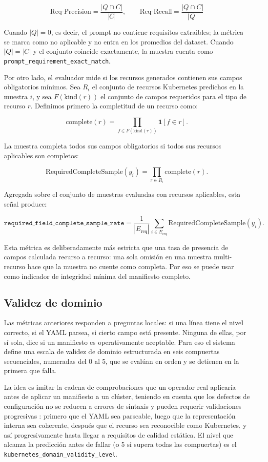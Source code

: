 $$\text{Req-Precision} = \frac{|Q \cap C|}{|C|}, \qquad \text{Req-Recall} = \frac{|Q \cap C|}{|Q|}$$

Cuando $|Q| = 0$, es decir, el prompt no contiene requisitos extraibles; la métrica se marca como no aplicable y no entra en los promedios
del dataset. Cuando $|Q| = |C|$ y el conjunto coincide exactamente, la muestra cuenta como \texttt{prompt\_requirement\_exact\_match}.

Por otro lado, el evaluador mide si los recursos generados contienen sus campos obligatorios mínimos. Sea \(R_i\) el conjunto de recursos Kubernetes predichos en la muestra \(i\),
y sea \(F(\mathrm{kind}(r))\) el conjunto de campos requeridos para el tipo de recurso \(r\). Definimos primero la completitud de un recurso como:

\[
\mathrm{complete}(r) =
\prod_{f \in F(\mathrm{kind}(r))}\mathbf{1}[f \in r].
\]

La muestra completa todos sus campos obligatorios si todos sus recursos aplicables son completos:

\[
\mathrm{RequiredCompleteSample}(y_i) =
\prod_{r \in R_i}\mathrm{complete}(r).
\]

Agregada sobre el conjunto de muestras evaluadas con recursos aplicables, esta señal produce:

\[
\texttt{required\_field\_complete\_sample\_rate}
=
\frac{1}{|E_\mathrm{req}|}
\sum_{i \in E_\mathrm{req}}
\mathrm{RequiredCompleteSample}(y_i).
\]

Esta métrica es deliberadamente más estricta que una tasa de presencia de campos calculada recurso a recurso: una sola omisión en una muestra multi-recurso hace que la muestra no
cuente como completa. Por eso se puede usar como indicador de integridad mínima del manifiesto completo.

\subsection{Validez de dominio}
\label{sec:ch4_metrics_domain}

Las métricas anteriores responden a preguntas locales: si una línea tiene el nivel correcto, si el YAML parsea, si cierto campo está presente.
Ninguna de ellas, por sí sola, dice si un manifiesto es operativamente aceptable. Para eso el sistema define una escala de validez de dominio
estructurada en seis compuertas secuenciales, numeradas del 0 al 5, que se evalúan en orden y se detienen en la primera que falla.

La idea es imitar la cadena de comprobaciones que un operador real aplicaría antes de aplicar un manifiesto a un clúster, teniendo en cuenta que los defectos de configuración no se reducen
a errores de sintaxis y pueden requerir validaciones progresivas \citep{zhang2025kubernetesdefects, kakarla2024diffy}: primero que el YAML sea parseable,
luego que la representación interna sea coherente, después que el recurso sea reconocible como Kubernetes, y así progresivamente hasta llegar a
requisitos de calidad estática. El nivel que alcanza la predicción antes de fallar (o 5 si supera todas las compuertas) es el
\texttt{kubernetes\_domain\_validity\_level}.

